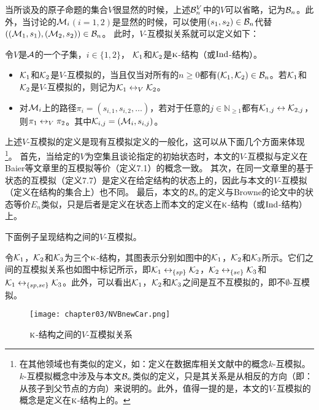 当所谈及的原子命题的集合$V$很显然的时候，上述${\cal B}_n^V$中的$V$可以省略，记为${\cal B}_n$。此外，当讨论的${\cal M}_i$$(i=1,2)$是显然的时候，可以使用$(s_1,s_2) \in {\cal B}_n$代替$(({\cal M}_1,s_1),({\cal M}_2,s_2)) \in {\cal B}_n$。
此时，$V$-互模拟关系就可以定义如下：
\begin{definition}[$V$-互模拟]\label{def:V-bisimulation}
	令$V$是${\cal A}$的一个子集，$i\in \{1,2\}$， ${\cal K}_1$和${\cal K}_2$是$\textsc{k}$-结构（或$\textrm{Ind}$-结构）。
	\begin{itemize}
		\item ${\cal K}_1$和${\cal K}_2$是$V$-互模拟的，当且仅当对所有的$n \ge 0$都有$({\cal K}_1, {\cal K}_2)\in {\cal B}_n$。若${\cal K}_1$和${\cal K}_2$是$V$-互模拟的，则记为${\cal K}_1 \leftrightarrow_V {\cal K}_2$。
		\item 对${\cal M}_i$上的路径$\pi_i=(s_{i,1},s_{i,2},\dots)$，若对于任意的$j\in \mathbb{N}_{\ge 1}$都有${\cal K}_{1,j} \leftrightarrow {\cal K}_{2,j}$，则$\pi_1 \leftrightarrow_V \pi_2$。其中${\cal K}_{i, j}=({\cal M}_i, s_{i,j})$。
	\end{itemize}
\end{definition}

上述$V$-互模拟的定义是现有互模拟定义的一般化，这可以从下面几个方面来体现\footnote{在其他领域也有类似的定义，如：定义在数据库相关文献中的概念$k$-互模拟\cite{kaushik2002updates}。$k$-互模拟概念中涉及与本文${\cal B}_n$类似的定义，只是其关系是从相反的方向（即：从孩子到父节点的方向）来说明的。此外，值得一提的是，本文的$V$-互模拟的概念是定义在$\textsc{k}$-结构上的。}。
首先，当给定的$V$为空集且谈论指定的初始状态时，本文的$V$-互模拟与定义在Baier等文章里的互模拟等价（定义7.1\cite{Baier:PMC:2008}）的概念一致。
其次，在同一文章里的基于状态的互模拟（定义7.7\cite{Baier:PMC:2008}）是定义在给定结构的状态上的，因此与本文的$V$-互模拟（定义在结构的集合上）也不同。
最后，本文的${\cal B}_n$的定义与Browne的论文中的状态等价$E_n$类似，只是后者是定义在状态上\cite{browne1988characterizing}而本文的定义在$\textsc{k}$-结构（或$\textrm{Ind}$-结构）上。


下面例子呈现结构之间的$V$-互模拟。
\begin{example}\label{exam:vB}
	令${\cal K}_1$，${\cal K}_2$和${\cal K}_3$为三个$\textsc{k}$-结构，其图表示分别如图中的${\cal K}_1$，${\cal K}_2$和${\cal K}_3$所示。它们之间的互模拟关系也如图中标记所示，即${\cal K}_1 \leftrightarrow_{\{sp\}} {\cal K}_2$，${\cal K}_2 \leftrightarrow_{\{se\}} {\cal K}_3$和${\cal K}_1 \leftrightarrow_{\{sp,se\}} {\cal K}_3$。此外，可以看出${\cal K}_1$，${\cal K}_2$和${\cal K}_3$之间是互不互模拟\cite{Baier:PMC:2008}的，即不$\emptyset$-互模拟。
	\begin{figure*}[!htb]
		\centering
		\texttt{[image: chapter03/NVBnewCar.png]}\\
		\caption{$\textsc{k}$-结构之间的$V$-互模拟关系}
		\label{Fig:chapter05:v1uv2}
	\end{figure*}
\end{example}

